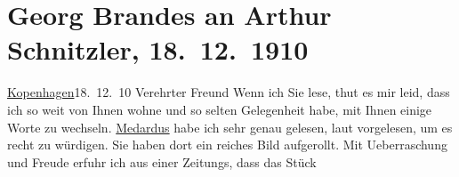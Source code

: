 

         
         \newcommand{\erwaehntePersonen}{Personen: Richard Beer-Hofmann, Johann Wolfgang von Goethe, Heinrich von Kleist}
         \newcommand{\erwaehnteInstitutionen}{}
         \newcommand{\erwaehnteOrte}{Orte: Deutschland, Kopenhagen, Wien}
         \newcommand{\erwaehnteWerke}{Werke: Der junge Medardus. Dramatische Historie in einem Vorspiel und fünf Aufzügen, Tagebücher}
               \section[Georg Brandes an Arthur Schnitzler, 18. 12. 1910]{ Georg Brandes an Arthur Schnitzler, 18. 12. 1910}\nopagebreak{}\rehead{ }\begin{ledgroupsized}[t]{13cm}\normalsize\beginnumbering \toendnotes[C]{\smallbreak\pagebreak[2]} 
\toendnotes[C]{\smallbreak}\pstart
           \raggedleft{}{\pb}\uline{Kopenhagen}18. 12. 10\pend
           \pstart{}Verehrter Freund\pend\pstart
           Wenn ich Sie lese, thut es mir leid, dass ich so weit von Ihnen wohne und so
                    selten Gelegenheit habe, mit Ihnen einige Worte zu wechseln.\pend
           \pstart
           \uline{Medardus} habe ich sehr genau gelesen, laut vorgelesen, um es recht zu würdigen. Sie
                    haben dort ein reiches Bild aufgerollt. Mit Ueberraschung und Freude erfuhr ich
                    aus einer Zeitungs\label{K_L01991_1v}\label{K_L01991_1h}, dass das Stück

\end{ledgroupsized}
